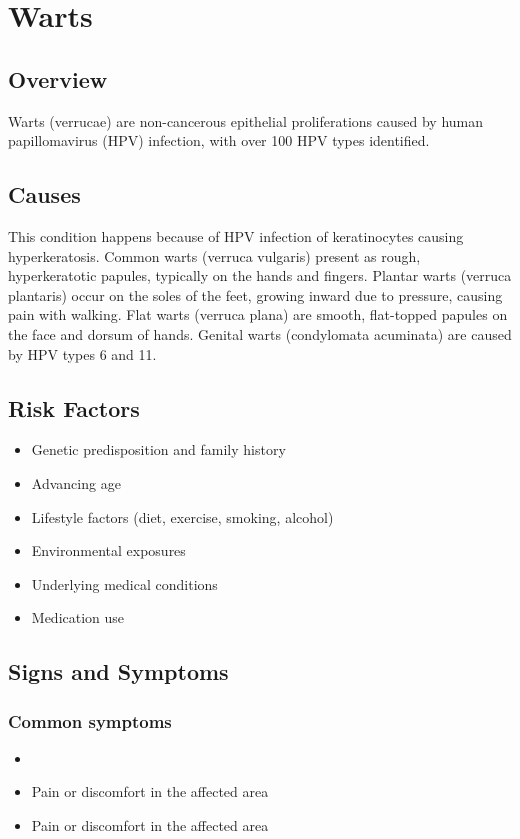 \chapter{Warts}
\label{sec:Warts}

\section{Overview}
Warts (verrucae) are non-cancerous epithelial proliferations caused by human papillomavirus (HPV) infection, with over 100 HPV types identified.
\section{Causes}
This condition happens because of HPV infection of keratinocytes causing hyperkeratosis. Common warts (verruca vulgaris) present as rough, hyperkeratotic papules, typically on the hands and fingers. Plantar warts (verruca plantaris) occur on the soles of the feet, growing inward due to pressure, causing pain with walking. Flat warts (verruca plana) are smooth, flat-topped papules on the face and dorsum of hands. Genital warts (condylomata acuminata) are caused by HPV types 6 and 11.     
\section{Risk Factors}

\begin{itemize}[noitemsep]
  \item Genetic predisposition and family history
  \item Advancing age
  \item Lifestyle factors (diet, exercise, smoking, alcohol)
  \item Environmental exposures
  \item Underlying medical conditions
  \item Medication use
\end{itemize}
\section{Signs and Symptoms}

\subsection{Common symptoms}
\begin{itemize}[noitemsep]
  \item \item Pain or discomfort in the affected area    \item Pain or discomfort in the affected area
  \end{itemize}

